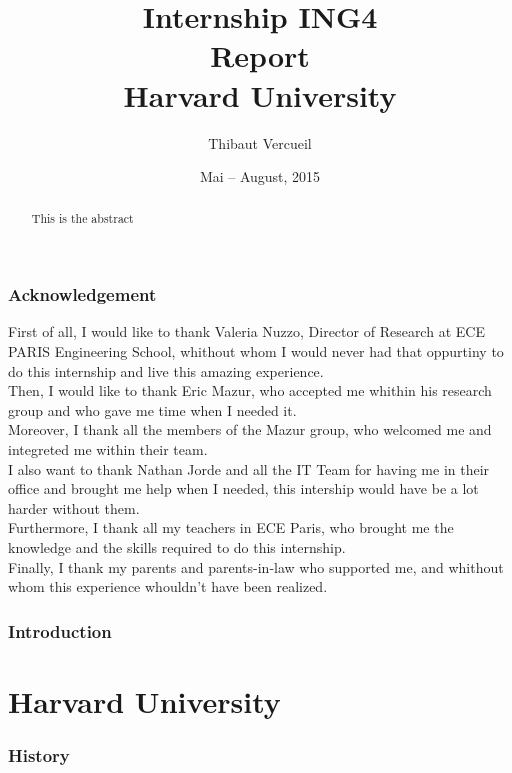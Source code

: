 \documentclass[10pt,a4paper]{article}
\title{{\Huge Internship ING4}\\ Report\\ \vspace{1cm} Harvard University}
\author{Thibaut Vercueil}
\date{Mai -- August, 2015}
\begin{document}
\maketitle

\begin{abstract}
This is the abstract\\\end{abstract}
\newpage
\tableofcontents
\newpage
\section*{Acknowledgement}
\vspace{1.5cm}
\indent First of all, I would like to thank Valeria Nuzzo, Director of Research at ECE PARIS Engineering School, whithout whom I would never had that oppurtiny to do this internship and live this amazing experience.\\

Then, I would like to thank Eric Mazur, who accepted me whithin his research group and who gave me time when I needed it.\\

Moreover, I thank all the members of the Mazur group, who welcomed me and integreted me within their team.\\

I also want to thank Nathan Jorde and all the IT Team for having me in their office and brought me help when I needed, this intership would have be a lot harder without them.\\

Furthermore, I thank all my teachers in ECE Paris, who brought me the knowledge and the skills required to do this internship.\\

Finally, I thank my parents and parents-in-law who supported me, and whithout whom this experience whouldn't have been realized.

\section{Introduction}
\newpage
\color{Crismon}
\part{Harvard University}
\color{black}

\section{History}
\end{document}
